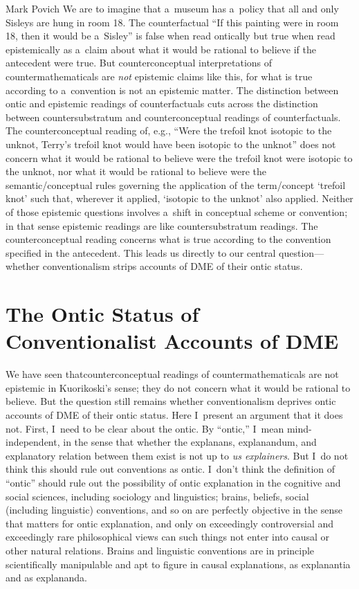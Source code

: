 \begin{artengenv}{Mark Povich}
 We are to imagine that a~museum has a~policy that all and only Sisleys are hung in room 18. The counterfactual ``If this painting were in room 18, then it would be a~Sisley'' is false when read ontically but true when read epistemically as a~claim about what it would be rational to believe if the antecedent were true. But counterconceptual interpretations of countermathematicals are \textit{not} epistemic claims like this, for what is true according to a~convention is not an epistemic matter. The distinction between ontic and epistemic readings of counterfactuals cuts across the distinction between countersubstratum and counterconceptual readings of counterfactuals. The counterconceptual reading of, e.g., ``Were the trefoil knot isotopic to the unknot, Terry's trefoil knot would have been isotopic to the unknot'' does not concern what it would be rational to believe were the trefoil knot were isotopic to the unknot, nor what it would be rational to believe were the semantic/conceptual rules governing the application of the term/concept ‘trefoil knot' such that, wherever it applied, ‘isotopic to the unknot' also applied. Neither of those epistemic questions involves a~shift in conceptual scheme or convention; in that sense epistemic readings are like countersubstratum readings. The counterconceptual reading concerns what is true according to the convention specified in the antecedent. This leads us directly to our central question---whether conventionalism strips accounts of DME of their ontic status.

\section{The Ontic Status of Conventionalist Accounts of DME}
We have seen thatcounterconceptual readings of countermathematicals are not epistemic in Kuorikoski's sense; they do not concern what it would be rational to believe. But the question still remains whether conventionalism deprives ontic accounts of DME of their ontic status. Here I~present an argument that it does not. First, I~need to be clear about the ontic. By ``ontic,'' I~mean mind-independent, in the sense that whether the explanans, explanandum, and explanatory relation between them exist is not up to \textit{us explainers}. But I~do not think this should rule out conventions as ontic. I~don't think the definition of ``ontic'' should rule out the possibility of ontic explanation in the cognitive and social sciences, including sociology and linguistics; brains, beliefs, social (including linguistic) conventions, and so on are perfectly objective in the sense that matters for ontic explanation, and only on exceedingly controversial and exceedingly rare philosophical views can such things not enter into causal or other natural relations. Brains and linguistic conventions are in principle scientifically manipulable and apt to figure in causal explanations, as explanantia and as explananda.


\end{artengenv}
